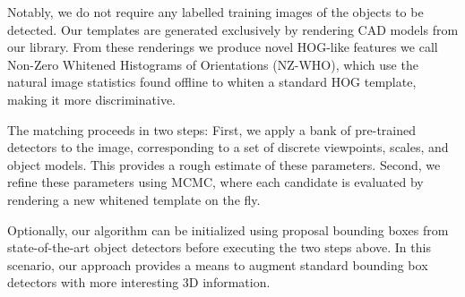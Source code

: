 \documentclass[10pt,twocolumn,letterpaper]{article}
\begin{document}
Notably, we do not require any labelled training images of the objects to be detected. Our templates are generated exclusively by rendering CAD models from our library. From these renderings we produce novel HOG-like features we call Non-Zero Whitened Histograms of Orientations (NZ-WHO), which use the natural image statistics found offline to whiten a standard HOG template, making it more discriminative.

The matching proceeds in two steps: First, we apply a bank of pre-trained detectors to the image, corresponding to a set of discrete viewpoints, scales, and object models. This provides a rough estimate of these parameters. Second, we refine these parameters using MCMC, where each candidate is evaluated by rendering a new whitened template on the fly. 

Optionally, our algorithm can be initialized using proposal bounding boxes from state-of-the-art object detectors \cite{Felzenszwalb10,Girshick14} before executing the two steps above. In this scenario, our approach provides a means to augment standard bounding box detectors with more interesting 3D information.
\end{document}
